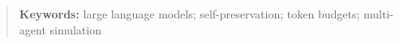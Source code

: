 \begin{abstract}

\textbf{Keywords:}
large language models; self-preservation; token budgets; multi-agent simulation
\end{abstract}

